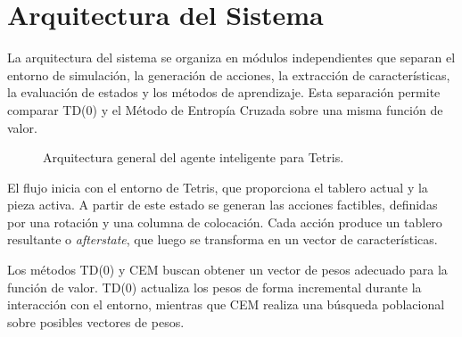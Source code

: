 \section{Arquitectura del Sistema}
\label{sec:arquitectura}

La arquitectura del sistema se organiza en módulos independientes que separan el entorno de simulación, la generación de acciones, la extracción de características, la evaluación de estados y los métodos de aprendizaje. Esta separación permite comparar TD(0) y el Método de Entropía Cruzada sobre una misma función de valor.

\begin{figure}[H]
\centering
{}
\caption{Arquitectura general del agente inteligente para Tetris.}
\label{fig:arquitectura}
\end{figure}

El flujo inicia con el entorno de Tetris, que proporciona el tablero actual y la pieza activa. A partir de este estado se generan las acciones factibles, definidas por una rotación y una columna de colocación. Cada acción produce un tablero resultante o \emph{afterstate}, que luego se transforma en un vector de características.

Los métodos TD(0) y CEM buscan obtener un vector de pesos adecuado para la función de valor. TD(0) actualiza los pesos de forma incremental durante la interacción con el entorno, mientras que CEM realiza una búsqueda poblacional sobre posibles vectores de pesos.
